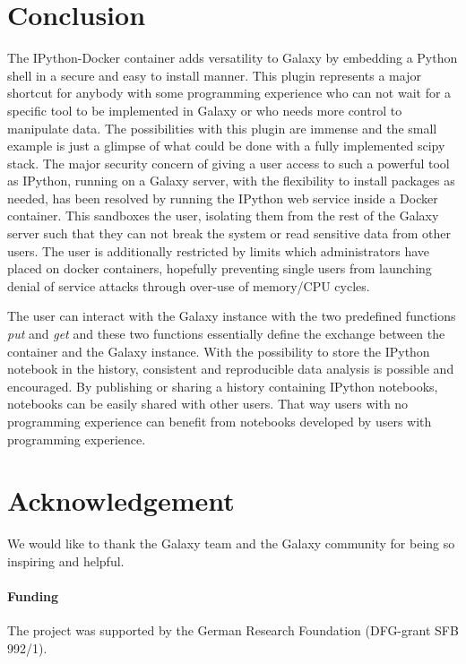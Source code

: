 \documentclass{bioinfo}
\begin{document}
\section{Conclusion}
The IPython-Docker container adds versatility to Galaxy by embedding a Python shell in a secure and easy to install manner. This plugin represents a major shortcut for anybody with some programming experience who can not wait for a specific tool to be implemented in Galaxy or who needs more control to manipulate data. The possibilities with this plugin are immense and the small example is just a glimpse of what could be done with a fully implemented scipy stack. The major security concern of giving a user access to such a powerful tool as IPython, running on a Galaxy server, with the flexibility to install packages as needed, has been resolved by running the IPython web service inside a Docker container. This sandboxes the user, isolating them from the rest of the Galaxy server such that they can not break the system or read sensitive data from other users. The user is additionally restricted by limits which administrators have placed on docker containers, hopefully preventing single users from launching denial of service attacks through over-use of memory/CPU cycles. %

The user can interact with the Galaxy instance with the two predefined functions \textit{put} and \textit{get} and these two functions essentially define the exchange between the container and the Galaxy instance. With the possibility to store the IPython notebook in the history, consistent and reproducible data analysis is possible and encouraged. By publishing or sharing a history containing IPython notebooks, notebooks can be easily shared with other users. That way users with no programming experience can benefit from notebooks developed by users with programming experience.



\section*{Acknowledgement}
We would like to thank the Galaxy team and the Galaxy community for being so inspiring and helpful.


\paragraph{Funding\textcolon} The project was supported by the German Research Foundation (DFG-grant SFB 992/1).
\end{document}
